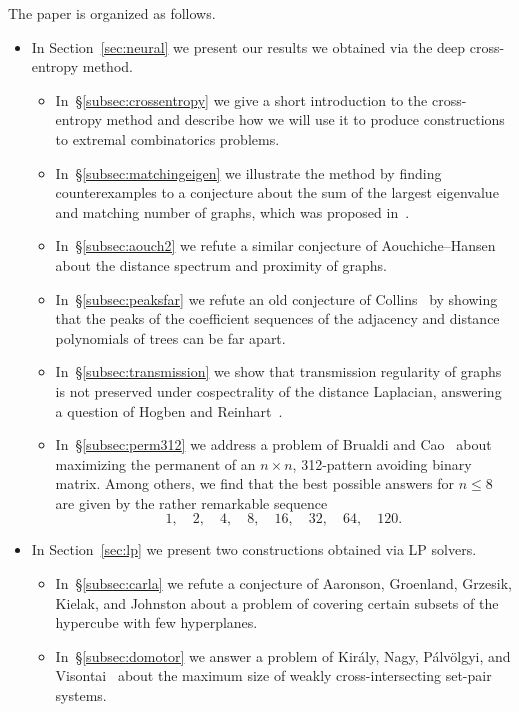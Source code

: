 \documentclass[11pt,english]{article}
\theoremstyle{plain}
\theoremstyle{remark}
\begin{document}
The paper is organized as follows.
\begin{itemize}
\item In Section~\ref{sec:neural} we present our results we obtained via the deep cross-entropy method.
\begin{itemize}
    \item In~\S\ref{subsec:crossentropy} we give a short introduction to the cross-entropy method and describe how we will use it to produce constructions to extremal combinatorics problems.
    \item In~\S\ref{subsec:matchingeigen} we illustrate the method by finding  counterexamples to a conjecture about the sum of the largest eigenvalue and matching number of graphs, which was proposed in~\cite{aouch}. %
    \item In~\S\ref{subsec:aouch2} we refute a similar conjecture of Aouchiche--Hansen~\cite{aouchhansen} about the distance spectrum and proximity of graphs. %
    \item In~\S\ref{subsec:peaksfar} we refute an old conjecture of Collins~\cite{collins} by showing that the peaks of the coefficient sequences of the adjacency and distance polynomials of trees can be far apart.
    \item In~\S\ref{subsec:transmission} we show that transmission regularity of graphs is not preserved under cospectrality of the distance Laplacian, answering a question of Hogben and Reinhart~\cite{surveydistance}.
    \item In~\S\ref{subsec:perm312} we address a problem of Brualdi and Cao~\cite{brualdi} about maximizing the permanent of an $n\times n$, 312-pattern avoiding binary matrix. Among others, we find that the best possible answers for $n\leq 8$ are given by the rather remarkable sequence
    $$1,\quad 2,\quad 4,\quad 8,\quad 16,\quad 32,\quad 64,\quad 120.$$
\end{itemize}
\item In Section~\ref{sec:lp} we present two constructions obtained via LP solvers.
\begin{itemize}
    \item In~\S\ref{subsec:carla} we refute a conjecture of Aaronson, Groenland, Grzesik, Kielak, and Johnston\cite{aaronson} about a problem of covering certain subsets of the hypercube with few hyperplanes.
    \item In~\S\ref{subsec:domotor} we answer a problem of Kir\'aly, Nagy, P\'alv\"olgyi, and Visontai~\cite{domotor} about the maximum size of weakly cross-intersecting set-pair systems.
\end{itemize}
\end{itemize}
\end{document}
